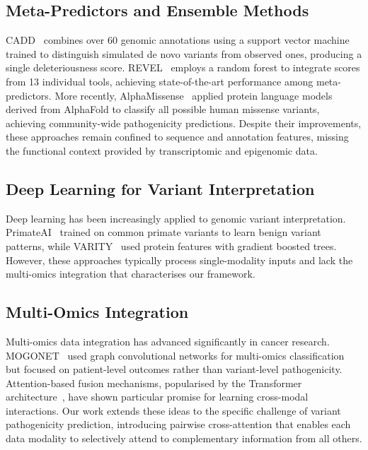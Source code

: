 \documentclass[journal,twoside]{IEEEtran}
\begin{document}
\subsection{Meta-Predictors and Ensemble Methods}

CADD~\cite{rentzsch2019cadd} combines over 60 genomic annotations using a
support vector machine trained to distinguish simulated de novo variants from
observed ones, producing a single deleteriousness score. REVEL~\cite{ioannidis2016revel}
employs a random forest to integrate scores from 13 individual tools,
achieving state-of-the-art performance among meta-predictors. More recently,
AlphaMissense~\cite{cheng2023alphamissense} applied protein language models
derived from AlphaFold to classify all possible human missense variants, achieving
community-wide pathogenicity predictions. Despite their improvements, these
approaches remain confined to sequence and annotation features, missing the
functional context provided by transcriptomic and epigenomic data.

\subsection{Deep Learning for Variant Interpretation}

Deep learning has been increasingly applied to genomic variant interpretation.
PrimateAI~\cite{sundaram2018primateai} trained on common primate variants to
learn benign variant patterns, while VARITY~\cite{wu2021varity} used protein
features with gradient boosted trees. However, these approaches typically
process single-modality inputs and lack the multi-omics integration that
characterises our framework.

\subsection{Multi-Omics Integration}

Multi-omics data integration has advanced significantly in cancer research.
MOGONET~\cite{wang2021mogonet} used graph convolutional networks for multi-omics
classification but focused on patient-level outcomes rather than variant-level
pathogenicity. Attention-based fusion mechanisms, popularised by the
Transformer architecture~\cite{vaswani2017attention}, have shown particular
promise for learning cross-modal interactions. Our work extends these ideas to
the specific challenge of variant pathogenicity prediction, introducing
pairwise cross-attention that enables each data modality to selectively attend
to complementary information from all others.
\end{document}
